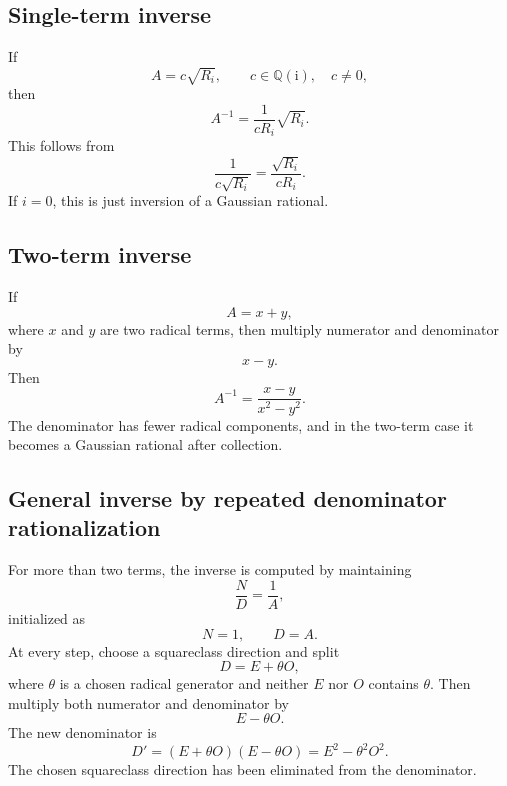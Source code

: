 \documentclass[11pt]{article}
\newcommand{\QQ}{\mathbb{Q}}
\newcommand{\ii}{\mathrm{i}}
\begin{document}
\subsection{Single-term inverse}

If
\begin{equation}
  A=c\sqrt{R_i},\qquad c\in\QQ(\ii),\quad c\neq0,
\end{equation}
then
\begin{equation}
  A^{-1}=\frac{1}{cR_i}\sqrt{R_i}.
\end{equation}
This follows from
\begin{equation}
  \frac{1}{c\sqrt{R_i}}=\frac{\sqrt{R_i}}{cR_i}.
\end{equation}
If \(i=0\), this is just inversion of a Gaussian rational.

\subsection{Two-term inverse}

If
\begin{equation}
  A=x+y,
\end{equation}
where \(x\) and \(y\) are two radical terms, then multiply numerator and denominator by
\begin{equation}
  x-y.
\end{equation}
Then
\begin{equation}
  A^{-1}=\frac{x-y}{x^2-y^2}.
\end{equation}
The denominator has fewer radical components, and in the two-term case it becomes a Gaussian rational after collection.

\subsection{General inverse by repeated denominator rationalization}

For more than two terms, the inverse is computed by maintaining
\begin{equation}
  \frac{N}{D}=\frac{1}{A},
\end{equation}
initialized as
\begin{equation}
  N=1,\qquad D=A.
\end{equation}
At every step, choose a squareclass direction and split
\begin{equation}
  D=E+\theta O,
\end{equation}
where \(\theta\) is a chosen radical generator and neither \(E\) nor \(O\) contains \(\theta\). Then multiply both numerator and denominator by
\begin{equation}
  E-\theta O.
\end{equation}
The new denominator is
\begin{equation}
  D'=(E+\theta O)(E-\theta O)=E^2-\theta^2O^2.
\end{equation}
The chosen squareclass direction has been eliminated from the denominator.
\end{document}
